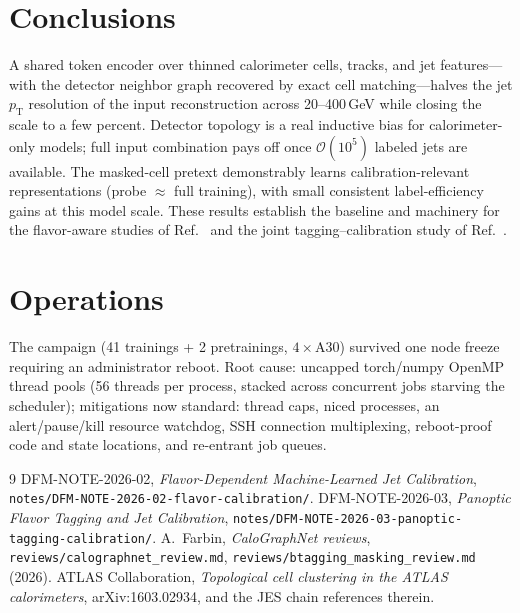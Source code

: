 \documentclass[11pt]{article}
\newcommand{\pt}{\ensuremath{p_\mathrm{T}}}
\begin{document}
\section{Conclusions}
A shared token encoder over thinned calorimeter cells, tracks, and jet features---with
the detector neighbor graph recovered by exact cell matching---halves the jet \pt{}
resolution of the input reconstruction across 20--400\,GeV while closing the scale to
a few percent. Detector topology is a real inductive bias for calorimeter-only models;
full input combination pays off once $\mathcal{O}(10^5)$ labeled jets are available.
The masked-cell pretext demonstrably learns calibration-relevant representations
(probe $\approx$ full training), with small consistent label-efficiency gains at this
model scale. These results establish the baseline and machinery for the flavor-aware
studies of Ref.~\cite{note2} and the joint tagging--calibration study of
Ref.~\cite{note3}.

\appendix
\section{Operations}
The campaign (41 trainings + 2 pretrainings, $4\times$A30) survived one node freeze
requiring an administrator reboot. Root cause: uncapped torch/numpy OpenMP thread
pools (56 threads per process, stacked across concurrent jobs starving the scheduler);
mitigations now standard: thread caps, niced processes, an alert/pause/kill resource
watchdog, SSH connection multiplexing, reboot-proof code and state locations, and
re-entrant job queues.

\begin{thebibliography}{9}
 DFM-NOTE-2026-02, \emph{Flavor-Dependent Machine-Learned Jet
Calibration}, \texttt{notes/DFM-NOTE-2026-02-flavor-calibration/}.
 DFM-NOTE-2026-03, \emph{Panoptic Flavor Tagging and Jet Calibration},
\texttt{notes/DFM-NOTE-2026-03-panoptic-tagging-calibration/}.
 A.~Farbin, \emph{CaloGraphNet reviews},
\texttt{reviews/calographnet\_review.md},
\texttt{reviews/btagging\_masking\_review.md} (2026).
 ATLAS Collaboration, \emph{Topological cell clustering in the ATLAS
calorimeters}, arXiv:1603.02934, and the JES chain references therein.
\end{thebibliography}
\end{document}
